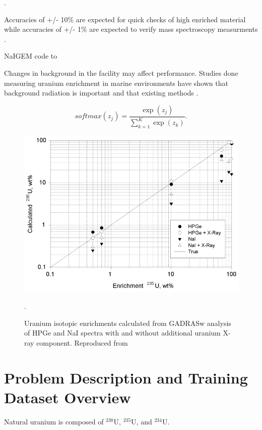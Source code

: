  \cite{VESTERLUND2013}.

Accuracies of +/- 10\% are expected for quick checks of high enriched material while accuracies of +/- 1\% are expected to verify mass spectroscopy measurments \cite{Kull1974}.


NaIGEM code to \cite{MORTREAU2004} 


Changes in background in the facility may affect performance. Studies done measuring uranium enrichment in marine environments have shown that background radiation is important and that existing methods  \cite{Hofstetter2008}.


\begin{equation} \label{eq:uenrichment}
softmax(z_j) = \frac{\exp(z_j)} {\sum_{k=1}^{K} \exp(z_k)}.
\end{equation}

\begin{figure}[H]
	\centering
	\includegraphics[width=0.99\linewidth]{images/GADRAS_enrichment_hofstetter}
	\caption{Uranium isotopic enrichments calculated from GADRASw analysis of HPGe and NaI spectra with and without additional uranium X-ray component. Reproduced from \cite{Hofstetter2008}}.
	\label{fig:GADRAS_enrichment_hofstetter}
\end{figure}


\section{Problem Description and Training Dataset Overview}

Natural uranium is composed of $^{238}$U, $^{235}$U, and $^{234}$U. 

